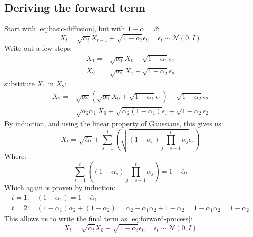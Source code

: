 \documentclass[a4paper, 12pt]{olplainarticle}
\begin{document}
\subsection{Deriving the forward term} \label{ap:forward-term}
Start with \cref{eq:basic-diffusion}, but with $1-\alpha = \beta$:
\begin{equation}
    X_t = \sqrt{\alpha_t} X_{t-1} + \sqrt{1-\alpha_t} \epsilon_t, \quad \epsilon_t \sim \mathcal{N}(0,I)
\end{equation}
Write out a few steps:
\begin{align}
    X_1 =& \sqrt{\alpha_1} X_0 + \sqrt{1-\alpha_1} \epsilon_1 \\
    X_2 =& \sqrt{\alpha_2} X_1 + \sqrt{1-\alpha_2} \epsilon_2
\end{align}
substitute $X_1$ in $X_2$:
\begin{align}
    X_2 =& \sqrt{\alpha_2} (\sqrt{\alpha_1} X_0 + \sqrt{1-\alpha_1} \epsilon_1) + \sqrt{1-\alpha_2} \epsilon_2 \\
    =& \sqrt{\alpha_2 \alpha_1} X_0  + \sqrt{\alpha_2(1-\alpha_1)} \epsilon_1 + \sqrt{1-\alpha_2} \epsilon_2
\end{align}
By induction, and using the linear property of Gaussians, this gives us:
\begin{equation}
    X_t = \sqrt{\bar{\alpha}_t} + \sum_{s=1}^{t}\left( \sqrt{(1 - \alpha_s) \prod_{j=s+1}^{t}\alpha_j} \epsilon_s \right)
\end{equation}
Where:
\begin{equation}
    \sum_{s=1}^{t}\left((1 - \alpha_s) \prod_{j=s+1}^{t}\alpha_j \right) = 1 - \bar{\alpha}_t
\end{equation}
Which again is proven by induction:
\begin{align}
    t=1 \text{: }& (1 - \alpha_1) = 1 - \bar{\alpha}_1 \\
    t=2 \text{: }& (1 - \alpha_1) \alpha_2 + (1 - \alpha_2) = \alpha_2 - \alpha_1 \alpha_2  + 1 - \alpha_2 = 1 - \alpha_1 \alpha_2 =  1 - \bar{\alpha}_2
\end{align}
This allows us to write the final term as \cref{eq:forward-process}:
\begin{equation} 
    X_t = \sqrt{\bar{\alpha}_t}X_0+\sqrt{1-\bar{\alpha}_t} \epsilon_t, \quad \epsilon_t \sim \mathcal{N}(0,I)
\end{equation}
\end{document}
